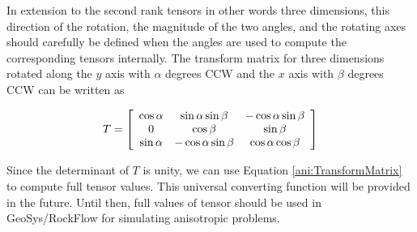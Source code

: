 In extension to the second rank tensors in other words three dimensions, this direction of the rotation, the magnitude of the two angles, and the rotating axes should carefully be defined when the angles are used to compute the corresponding tensors internally. The transform matrix for three dimensions rotated along the $y$ axis with  $\alpha$ degrees CCW and the $x$ axis with $\beta$ degrees CCW can be written as

\begin{eqnarray}
\label{ani:TransformMatrix3D}
T = \left[ {\begin{array}{*{20}c}
   {\cos \alpha } & {\sin \alpha \sin \beta } & { - \cos \alpha \sin \beta }  \\
   0 & {\cos \beta } & {\sin \beta }  \\
   {\sin \alpha } & { - \cos \alpha \sin \beta } & {\cos \alpha \cos \beta }  \\
\end{array}} \right]
\end{eqnarray}

Since the determinant of $T$ is unity, we can use Equation \ref{ani:TransformMatrix} to compute full tensor values.
This universal converting function will be provided in the future. Until then, full values of tensor should be used in GeoSys/RockFlow for simulating anisotropic problems.
